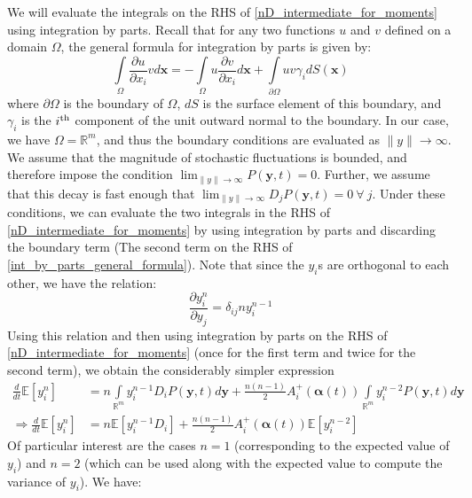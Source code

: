 We will evaluate the integrals on the RHS of \eqref{nD_intermediate_for_moments} using integration by parts. Recall that for any two functions $u$ and $v$ defined on a domain $\Omega$, the general formula for integration by parts is given by:
\begin{equation}
\label{int_by_parts_general_formula}
\int\limits_{\Omega}\frac{\partial u}{\partial x_i}vd\mathbf{x} = -\int\limits_{\Omega}u\frac{\partial v}{\partial x_i}d\mathbf{x} + \int\limits_{\partial\Omega}uv\gamma_{i}dS(\mathbf{x})
\end{equation}
where $\partial \Omega$ is the boundary of $\Omega$, $dS$ is the surface element of this boundary, and $\gamma_i$ is the $i\textsuperscript{th}$ component of the unit outward normal to the boundary. In our case, we have $\Omega = \mathbb{R}^m$, and thus the boundary conditions are evaluated as $\|y\| \to \infty$. We assume that the magnitude of stochastic fluctuations is bounded, and therefore impose the condition $\displaystyle \lim_{\|y\| \to \infty}  P(\mathbf{y},t) = 0$. Further, we assume that this decay is fast enough that $\displaystyle \lim_{\|y\| \to \infty}D_jP(\mathbf{y},t) = 0\ \forall \ j$. Under these conditions, we can evaluate the two integrals in the RHS of \eqref{nD_intermediate_for_moments} by using integration by parts and discarding the boundary term (The second term on the RHS of \eqref{int_by_parts_general_formula}). Note that since the $y_i$s are orthogonal to each other, we have the relation:
\begin{equation*}
\frac{\partial y_i ^{n}}{\partial y_j} = \delta_{ij}ny_i^{n-1}
\end{equation*}
Using this relation and then using integration by parts on the RHS of \eqref{nD_intermediate_for_moments} (once for the first term and twice for the second term), we obtain the considerably simpler expression
\begin{align}
\frac{d}{dt}\mathbb{E}[y_i^n] &= n\int\limits_{\mathbb{R}^m} y_i^{n-1}D_{i}P(\mathbf{y},t)d\mathbf{y} + \frac{n(n-1)}{2}A_i^+(\boldsymbol{\alpha}(t))\int\limits_{\mathbb{R}^m} y_i^{n-2}P(\mathbf{y},t)d\mathbf{y}\\
\Rightarrow \frac{d}{dt}\mathbb{E}[y_i^n] &= n\mathbb{E}[y_i^{n-1}D_{i}]+\frac{n(n-1)}{2}A_i^+(\boldsymbol{\alpha}(t))\mathbb{E}[y_i^{n-2}]\label{nD_general_moment_eqns}
\end{align}
Of particular interest are the cases $n=1$ (corresponding to the expected value of $y_i$) and $n=2$ (which can be used along with the expected value to compute the variance of $y_i$). We have:
